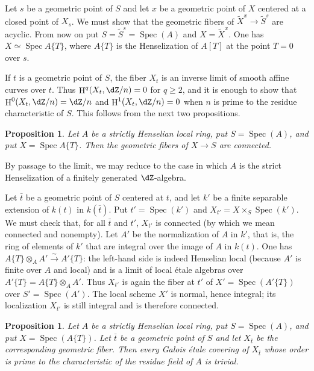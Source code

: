 \documentclass[12pt,oneside,english]{smfbook}
\DeclareMathOperator{\h}{H}
\DeclareMathOperator{\spec}{Spec}
\newcounter{char}
\newcommand{\iso}{\xrightarrow\sim}
\newtheorem{proposition}[subsubsection]{Proposition}
\begin{document}
Let $s$ be a geometric point of $S$ and let $x$ be a geometric point of $X$ centered at a closed point of $X_s$. We must show that the geometric fibers of $\widetilde X^x\to\widetilde S^s$ are acyclic. From now on put $S=\widetilde S^s=\spec(A)$ and $X=\widetilde X^x$. One has $X\simeq\spec A\{T\}$, where $A\{T\}$ is the Henselization of $A[T]$ at the point $T=0$ over $s$.

If $t$ is a geometric point of $S$, the fiber $X_t$ is an inverse limit of smooth affine curves over $t$. Thus $\h^q(X_t,\dZ/n)=0$ for $q\geqslant2$, and it is enough to show that $\h^0(X_t,\dZ/n)=\dZ/n$ and $\h^1(X_t,\dZ/n)=0$ when $n$ is prime to the residue characteristic of $S$. This follows from the next two propositions.

\begin{proposition}\label{I:5-2-2}
Let $A$ be a strictly Henselian local ring, put $S=\spec(A)$, and put $X=\spec A\{T\}$. Then the geometric fibers of $X\to S$ are connected.
\end{proposition}

By passage to the limit, we may reduce to the case in which $A$ is the strict Henselization of a finitely generated $\dZ$-algebra.

Let $\bar t$ be a geometric point of $S$ centered at $t$, and let $k'$ be a finite separable extension of $k(t)$ in $k(\bar t)$. Put $t'=\spec(k')$ and $X_{t'}=X\times_S\spec(k')$. We must check that, for all $\bar t$ and $t'$, $X_{t'}$ is connected (by which we mean connected and nonempty). Let $A'$ be the normalization of $A$ in $k'$, that is, the ring of elements of $k'$ that are integral over the image of $A$ in $k(t)$. One has $A\{T\}\otimes_AA'\iso A'\{T\}$: the left-hand side is indeed Henselian local (because $A'$ is finite over $A$ and local) and is a limit of local étale algebras over $A'\{T\}=A\{T\}\otimes_AA'$. Thus $X_{t'}$ is again the fiber at $t'$ of $X'=\spec(A'\{T\})$ over $S'=\spec(A')$. The local scheme $X'$ is normal, hence integral; its localization $X_{t'}$ is still integral and is therefore connected.

\begin{proposition}\label{I:5-2-3}
Let $A$ be a strictly Henselian local ring, put $S=\spec(A)$, and put $X=\spec(A\{T\})$. Let $\bar t$ be a geometric point of $S$ and let $X_{\bar t}$ be the corresponding geometric fiber. Then every Galois étale covering of $X_{\bar t}$ whose order is prime to the characteristic of the residue field of $A$ is trivial.
\end{proposition}
\end{document}
